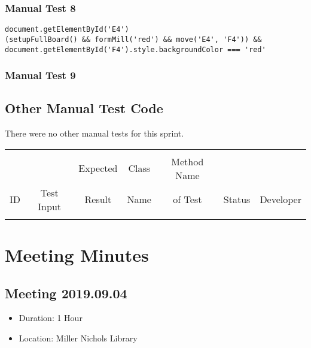 \documentclass[11pt]{article}
\begin{document}
\subsubsection{Manual Test 8}
\label{sec:orgdfb2713}
\lstset{language=js,label= ,caption= ,captionpos=b,numbers=none}
\begin{lstlisting}
document.getElementById('E4')
(setupFullBoard() && formMill('red') && move('E4', 'F4')) && document.getElementById('F4').style.backgroundColor === 'red'
\end{lstlisting}

\subsubsection{Manual Test 9}
\label{sec:orgf6b4157}

\subsection{Other Manual Test Code}
\label{sec:org43855c3}

There were no other manual tests for this sprint.

\begin{center}
\begin{tabular}{|c|c|c|c|c|c|c|}
 &  &  &  &  &  & \\
 &  & Expected & Class & Method Name &  & \\
ID & Test Input & Result & Name & of Test & Status & Developer\\
\hline
 &  &  &  &  &  & \\
\end{tabular}
\end{center}

\section{Meeting Minutes}
\label{sec:org7ff693b}
\subsection{Meeting 2019.09.04}
\label{sec:orga9125f6}
\begin{itemize}
\item Duration: 1 Hour
\item Location: Miller Nichols Library
\end{itemize}
\end{document}
